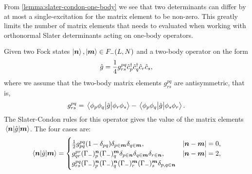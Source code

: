             From \autoref{lemma:slater-condon-one-body} we see that two
            determinants can differ by at most a single-excitation for the
            matrix element to be non-zero.
            This greatly limits the number of matrix elements that needs to
            evaluated when working with orthonormal Slater determinants acting
            on one-body operators.
            \begin{lemma}
                \label{lemma:slater-condon-two-body}
                Given two Fock states $\ket{\boldsymbol{n}}, \ket{\boldsymbol{m}} \in F_{-}(L,
                N)$ and a two-body operator on the form
                \begin{align}
                    \hat{g} = \frac{1}{4}g^{pq}_{rs}\hat{c}_{p}^{\dagger}\hat{c}_{q}^{\dagger}\hat{c}_{r}\hat{c}_{s},
                \end{align}
                where we assume that the two-body matrix elements $g^{pq}_{rs}$
                are antisymmetric, that is,
                \begin{align}
                    g^{pq}_{rs}
                    = \mel{\phi_p\phi_q}{\hat{g}}{\phi_r\phi_s}
                    - \mel{\phi_p\phi_q}{\hat{g}}{\phi_s\phi_r}.
                \end{align}
                The Slater-Condon rules for this operator gives the value of the
                matrix elements $\mel{\boldsymbol{n}}{\hat{g}}{\boldsymbol{m}}$.
                The four cases are:
                \begin{gather}
                    \mel{\boldsymbol{n}}{\hat{g}}{\boldsymbol{m}}
                    = \begin{cases}
                        \frac{1}{2} g^{pq}_{pq}(1 - \delta_{pq})
                        \delta_{p \in \boldsymbol{m}}
                        \delta_{q \in \boldsymbol{m}},
                        & \abs{\boldsymbol{n} - \boldsymbol{m}} = 0,
                        \\
                        g^{pr}_{qr}
                        (\Gamma_{-})^{\boldsymbol{n}}_{p}
                        (\Gamma_{-})^{\boldsymbol{m}}_{q}
                        \delta_{p \in \boldsymbol{n}}
                        \delta_{q \in \boldsymbol{m}}
                        \delta_{r \in \boldsymbol{n}},
                        & \abs{\boldsymbol{n} - \boldsymbol{m}} = 2,
                        \\
                        g^{pq}_{rs}
                        (\Gamma_{-})^{\boldsymbol{n}}_{p}
                        (\Gamma_{-})^{\boldsymbol{n}}_{q}
                        (\Gamma_{-})^{\boldsymbol{m}}_{r}
                        (\Gamma_{-})^{\boldsymbol{m}}_{s}
                        \delta_{p, q \in \boldsymbol{n}}

\end{cases}
\end{gather}
\end{lemma}
